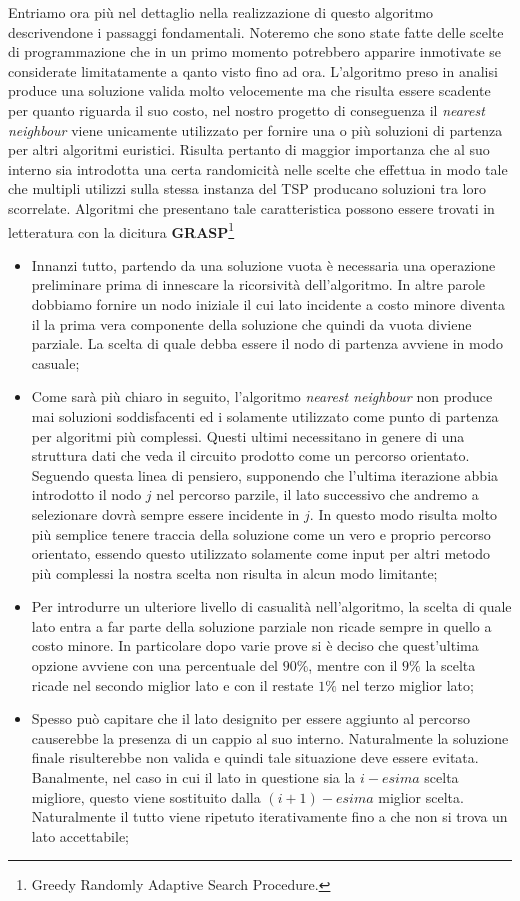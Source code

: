 \documentclass[11pt]{article}
\begin{document}
Entriamo ora più nel dettaglio nella realizzazione di questo algoritmo descrivendone i passaggi fondamentali. Noteremo che sono state fatte delle scelte di programmazione che in un primo momento potrebbero apparire inmotivate se considerate limitatamente a qanto visto fino ad ora.
L'algoritmo preso in analisi produce una soluzione valida molto velocemente ma che risulta essere scadente per quanto riguarda il suo costo, nel nostro progetto di conseguenza il \textit{nearest neighbour} viene unicamente utilizzato per fornire una o più soluzioni di partenza per altri algoritmi euristici. Risulta pertanto di maggior importanza che al suo interno sia introdotta una certa randomicità nelle scelte che effettua in modo tale che multipli utilizzi sulla stessa instanza del TSP producano soluzioni tra loro scorrelate. Algoritmi che presentano tale caratteristica possono essere trovati in letteratura con la dicitura \textbf{GRASP}\footnote{Greedy Randomly Adaptive Search Procedure.}
\begin{itemize}
    \item Innanzi tutto, partendo da una soluzione vuota è necessaria una operazione preliminare prima di innescare la ricorsività dell'algoritmo. In altre parole dobbiamo fornire un nodo iniziale il cui lato incidente a costo minore diventa il la prima vera componente della soluzione che quindi da vuota diviene parziale.
    La scelta di quale debba essere il nodo di partenza avviene in modo casuale;
    \item Come sarà più chiaro in seguito, l'algoritmo \textit{nearest neighbour} non produce mai soluzioni soddisfacenti ed i solamente utilizzato come punto di partenza per algoritmi più complessi. Questi ultimi necessitano in genere di una struttura dati che veda il circuito prodotto come un percorso orientato. Seguendo questa linea di pensiero, supponendo che l'ultima iterazione abbia introdotto il nodo $j$ nel percorso parzile, il lato successivo che andremo a selezionare dovrà sempre essere incidente in $j$. In questo modo risulta molto più semplice tenere traccia della soluzione come un vero e proprio percorso orientato, essendo questo utilizzato solamente come input per altri metodo più complessi la nostra scelta non risulta in alcun modo limitante;
    \item Per introdurre un ulteriore livello di casualità nell'algoritmo, la scelta di quale lato entra a far parte della soluzione parziale non ricade sempre in quello a costo minore. In particolare dopo varie prove si è deciso che quest'ultima opzione avviene con una percentuale del $90\%$, mentre con il $9\%$ la scelta ricade nel secondo miglior lato e con il restate $1\%$ nel terzo miglior lato;
    \item Spesso può capitare che il lato designito per essere aggiunto al percorso causerebbe la presenza di un cappio al suo interno. Naturalmente la soluzione finale risulterebbe non valida e quindi tale situazione deve essere evitata. Banalmente, nel caso in cui il lato in questione sia la $i-esima$ scelta migliore, questo viene sostituito dalla $(i+1)-esima$ miglior scelta. Naturalmente il tutto viene ripetuto iterativamente fino a che non si trova un lato accettabile;
\end{itemize}
\end{document}
